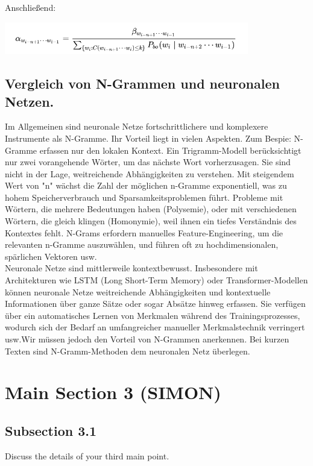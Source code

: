 \documentclass[12pt]{article}
\begin{document}
Anschließend:

\begin{center}
	\includegraphics[width=0.8\textwidth]{statics/Borisov/11.PNG}
\end{center}

\subsection{Vergleich von N-Grammen und neuronalen Netzen.}
\quad Im Allgemeinen sind neuronale Netze fortschrittlichere und komplexere Instrumente als N-Gramme. Ihr Vorteil liegt in vielen Aspekten. Zum Bespie: N-Gramme erfassen nur den lokalen Kontext. Ein Trigramm-Modell berücksichtigt nur zwei vorangehende Wörter, um das nächste Wort vorherzusagen. Sie sind nicht in der Lage, weitreichende Abhängigkeiten zu verstehen. Mit steigendem Wert von "n" wächst die Zahl der möglichen n-Gramme exponentiell, was zu hohem Speicherverbrauch und Sparsamkeitsproblemen führt. Probleme mit Wörtern, die mehrere Bedeutungen haben (Polysemie), oder mit verschiedenen Wörtern, die gleich klingen (Homonymie), weil ihnen ein tiefes Verständnis des Kontextes fehlt. N-Grams erfordern manuelles Feature-Engineering, um die relevanten n-Gramme auszuwählen, und führen oft zu hochdimensionalen, spärlichen Vektoren usw. \cite{roshmita2023} \cite{clarkGiorgoloLappin}
\\
\quad Neuronale Netze sind mittlerweile kontextbewusst. Insbesondere mit Architekturen wie LSTM (Long Short-Term Memory) oder Transformer-Modellen können neuronale Netze weitreichende Abhängigkeiten und kontextuelle Informationen über ganze Sätze oder sogar Absätze hinweg erfassen. Sie verfügen über ein automatisches Lernen von Merkmalen während des Trainingsprozesses, wodurch sich der Bedarf an umfangreicher manueller Merkmalstechnik verringert usw.Wir müssen jedoch den Vorteil von N-Grammen anerkennen. Bei kurzen Texten sind N-Gramm-Methoden dem neuronalen Netz überlegen.
\cite{babukumar2010}

\section{Main Section 3 (SIMON)}
\subsection{Subsection 3.1}
Discuss the details of your third main point.
\end{document}
